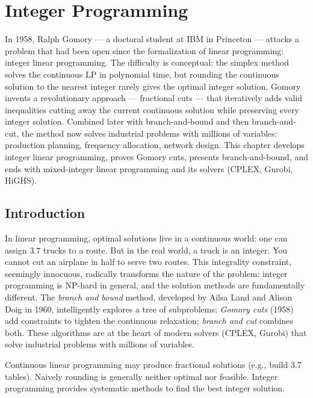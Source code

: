 \chapter{Integer Programming}
\label{ch:integer}

In 1958, Ralph Gomory --- a doctoral student at IBM in Princeton --- attacks a problem that had been open since the formalization of linear programming: integer linear programming. The difficulty is conceptual: the simplex method solves the continuous LP in polynomial time, but rounding the continuous solution to the nearest integer rarely gives the optimal integer solution. Gomory invents a revolutionary approach --- fractional cuts --- that iteratively adds valid inequalities cutting away the current continuous solution while preserving every integer solution. Combined later with branch-and-bound and then branch-and-cut, the method now solves industrial problems with millions of variables: production planning, frequency allocation, network design. This chapter develops integer linear programming, proves Gomory cuts, presents branch-and-bound, and ends with mixed-integer linear programming and its solvers (CPLEX, Gurobi, HiGHS).

\section{Introduction}

In linear programming, optimal solutions live in a continuous world: one can assign $3.7$ trucks to a route. But in the real world, a truck is an integer. You cannot cut an airplane in half to serve two routes. This integrality constraint, seemingly innocuous, radically transforms the nature of the problem: integer programming is NP-hard in general, and the solution methods are fundamentally different. The \emph{branch and bound} method, developed by Ailsa Land and Alison Doig in 1960, intelligently explores a tree of subproblems; \emph{Gomory cuts} (1958) add constraints to tighten the continuous relaxation; \emph{branch and cut} combines both. These algorithms are at the heart of modern solvers (CPLEX, Gurobi) that solve industrial problems with millions of variables.

\begin{intuition}
Continuous linear programming may produce fractional solutions (e.g., build 3.7
tables). Naively rounding is generally neither optimal nor feasible. Integer
programming provides systematic methods to find the best integer solution.
\end{intuition}

